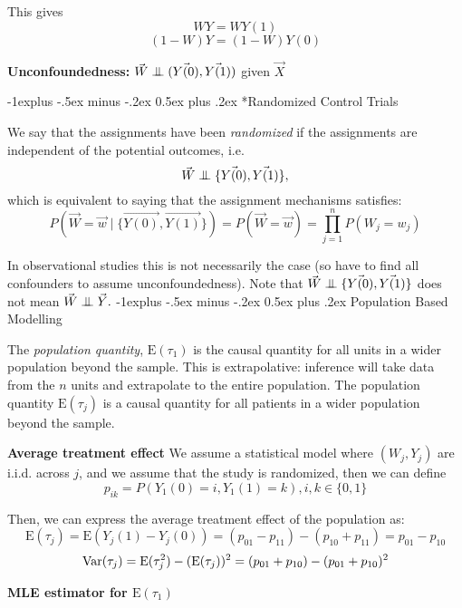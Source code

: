 \documentclass[10pt,landscape]{article}
\makeatletter
\newcommand\independent{\protect\mathpalette{\protect\independenT}{\perp}}
\def\independenT#1#2{\mathrel{\setbox0\hbox{$#1#2$}%
    \copy0\kern-\wd0\mkern4mu\box0}}
\renewcommand{\subsection}{\@startsection{subsection}{2}{0mm}%
                                {-1explus -.5ex minus -.2ex}%
                                {0.5ex plus .2ex}%
                                {\normalfont\normalsize\bfseries}}
\newcommand{\E}{\text{E}}
\makeatother
\begin{document}
\begin{multicols*}{3}
This gives $$WY = WY(1)$$ $$(1-W)Y = (1-W)Y(0)$$

\textbf{Unconfoundedness:} $\vec W\independent (\vec{Y(0)},\vec{Y(1)})$ given $\vec{X}$

\subsection*{Randomized Control Trials}

We say that the assignments have been \textit{randomized} if the assignments are independent of the potential outcomes, i.e.
$$\vec W \independent \{\vec{Y(0)}, \vec{Y(1)}\},$$ which is equivalent to saying that the assignment mechanisms satisfies: $$P(\vec W = \vec w \mid \{\vec{Y(0)}, \vec{Y(1)}\})= P(\vec W=\vec w) = \prod_{j=1}^{n}P(W_j=w_j)$$

In observational studies this is not necessarily the case (so have to find all confounders to assume unconfoundedness). Note that $\vec W \independent \{\vec{Y(0)}, \vec{Y(1)}\}$ does not mean $\vec W\independent \vec Y.$
\subsection{Population Based Modelling}

The \textit{population quantity}, $\E(\tau_1)$ is the causal quantity for all units in a wider population beyond the sample. This is extrapolative: inference will take data from the $n$ units and extrapolate to the entire population. The population quantity $\E(\tau_j)$ is a causal quantity for all patients in a wider population beyond the sample. 

\textbf{Average treatment effect}
    We assume a statistical model where $(W_j, Y_j)$ are i.i.d. across $j$, and we assume that the study is randomized, then we can define $$p_{ik} = P(Y_1(0) = i, Y_1(1) = k), i, k \in \{0, 1\}$$

    Then, we can express the average treatment effect of the population as:
    $$\E(\tau_j) = \E(Y_j(1)-Y_j(0)) = (p_{01}-p_{11})-(p_{10}+p_{11}) =p_{01} -p_{10} $$
    $$\Var(\tau_j) = \E(\tau_j^2) - (\E(\tau_j))^2 = (p_{01} + p_{10}) - (p_{01}+p_{10})^2$$


\textbf{MLE estimator for $\E(\tau_1)$ }



\end{multicols*}
\end{document}
